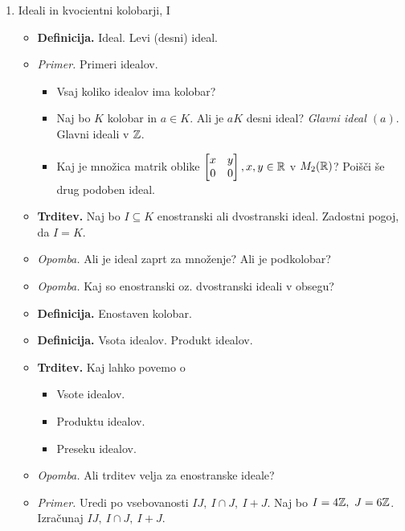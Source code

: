 \begin{enumerate}
    \item Ideali in kvocientni kolobarji, I
    \begin{itemize}
        \item \colorbox{purple!30}{\textbf{Definicija.}} Ideal. Levi (desni) ideal.
        \item \colorbox{yellow!30}{\emph{Primer.}} Primeri idealov.
        \begin{itemize}
            \item Vsaj koliko idealov ima kolobar?
            \item Naj bo $K$ kolobar in $a \in K$. Ali je $aK$ desni ideal? \emph{Glavni ideal $(a)$}. Glavni ideali v $\mathbb{Z}$.
            \item Kaj je množica matrik oblike $\begin{bmatrix}
                x & y \\ 0 & 0
            \end{bmatrix}, x,y \in \mathbb{R}$ v $M_2(\mathbb{R})$? Poišči še drug podoben ideal.         
        \end{itemize}
        \item \colorbox{blue!30}{\textbf{Trditev.}} Naj bo $I \subseteq K$ enostranski ali dvostranski ideal. Zadostni pogoj, da $I = K$.
            \item \colorbox{yellow!30}{\emph{Opomba.}} Ali je ideal zaprt za množenje? Ali je podkolobar?
            \item \colorbox{yellow!30}{\emph{Opomba.}} Kaj so enostranski oz. dvostranski ideali v obsegu?
            \item \colorbox{purple!30}{\textbf{Definicija.}} Enostaven kolobar.
            \item \colorbox{purple!30}{\textbf{Definicija.}} Vsota idealov. Produkt idealov.
            \item \colorbox{blue!30}{\textbf{Trditev.}} Kaj lahko povemo o
        \begin{itemize}
            \item Vsote idealov.
            \item Produktu idealov.
            \item Preseku idealov.
        \end{itemize}
        \item \colorbox{yellow!30}{\emph{Opomba.}} Ali trditev velja za enostranske ideale?
        \item \colorbox{yellow!30}{\emph{Primer.}} Uredi po vsebovanosti  $IJ, \ I \cap J, \ I + J$. Naj bo $I = 4\mathbb{Z}, \ J = 6\mathbb{Z}$. Izračunaj $IJ, \ I \cap J, \ I + J$.

\end{itemize}
\end{enumerate}
